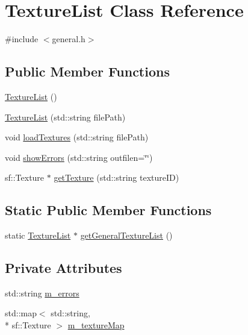 \hypertarget{class_texture_list}{\section{Texture\-List Class Reference}
\label{class_texture_list}
}


{\ttfamily \#include $<$general.\-h$>$}

\subsection*{Public Member Functions}
\begin{DoxyCompactItemize}
\item 
\hyperlink{class_texture_list_a750d37ace9aed214e8cbe1f940faf06f}{Texture\-List} ()
\item 
\hyperlink{class_texture_list_af10f38dd97933b3efd473b0bd2bafa77}{Texture\-List} (std\-::string file\-Path)
\item 
void \hyperlink{class_texture_list_a4c8c84b6df51995e568d7119d70f89a7}{load\-Textures} (std\-::string file\-Path)
\item 
void \hyperlink{class_texture_list_ade252d75b421d1b1a7ada32240e5c131}{show\-Errors} (std\-::string outfilen=\char`\"{}\char`\"{})
\item 
sf\-::\-Texture $\ast$ \hyperlink{class_texture_list_a27e768ab0f66150d4b45b5d4d0f08e4b}{get\-Texture} (std\-::string texture\-I\-D)
\end{DoxyCompactItemize}
\subsection*{Static Public Member Functions}
\begin{DoxyCompactItemize}
\item 
static \hyperlink{class_texture_list}{Texture\-List} $\ast$ \hyperlink{class_texture_list_ab97506e3c31990bf341103d1d4589829}{get\-General\-Texture\-List} ()
\end{DoxyCompactItemize}
\subsection*{Private Attributes}
\begin{DoxyCompactItemize}
\item 
std\-::string \hyperlink{class_texture_list_accfab4bb10cf490ab44f24a721bd9849}{m\-\_\-errors}
\item 
std\-::map$<$ std\-::string, \\*
sf\-::\-Texture $>$ \hyperlink{class_texture_list_a1e82ecc17a450b6afa112753bcaf139e}{m\-\_\-texture\-Map}
\end{DoxyCompactItemize}


